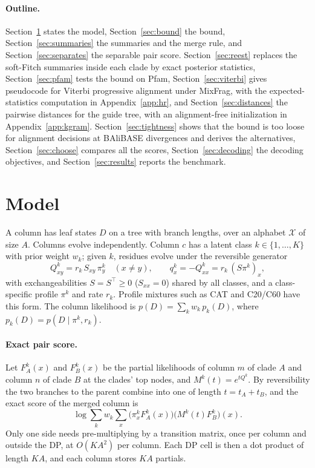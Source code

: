 \documentclass[11pt]{article}
\newcommand{\Xset}{\mathcal X}
\begin{document}
\paragraph{Outline.} Section~\ref{sec:model} states the model,
Section~\ref{sec:bound} the bound, Section~\ref{sec:summaries} the summaries
and the merge rule, and Section~\ref{sec:separates} the separable pair score.
Section~\ref{sec:reest} replaces the soft-Fitch summaries inside each clade by
exact posterior statistics, Section~\ref{sec:pfam} tests the bound on Pfam,
Section~\ref{sec:viterbi} gives pseudocode for Viterbi progressive
alignment under MixFrag, with the expected-statistics computation in
Appendix~\ref{app:hr}, and Section~\ref{sec:distances} the pairwise distances
for the guide tree, with an alignment-free initialization in
Appendix~\ref{app:kgram}. Section~\ref{sec:tightness} shows that the bound is too
loose for alignment decisions at BAliBASE divergences and derives the
alternatives, Section~\ref{sec:choose} compares all the scores,
Section~\ref{sec:decoding} the decoding objectives, and
Section~\ref{sec:results} reports the benchmark.

\section{Model}
\label{sec:model}

A column has leaf states $D$ on a tree with branch lengths, over an alphabet
$\Xset$ of size $A$. Columns evolve independently. Column $c$ has a latent
class $k\in\{1,\dots,K\}$ with prior weight $w_k$; given $k$, residues evolve
under the reversible generator
\[
Q^k_{xy}=r_k\,S_{xy}\,\pi^k_y\quad(x\ne y),\qquad
q^k_x=-Q^k_{xx}=r_k\,(S\pi^k)_x ,
\]
with exchangeabilities $S=S^\top\ge0$ ($S_{xx}=0$) shared by all classes, and a
class-specific profile $\pi^k$ and rate $r_k$. Profile mixtures such as CAT
\citep{Lartillot2004} and C20/C60 \citep{LeGascuelLartillot2008} have this form. The column
likelihood is $p(D)=\sum_kw_k\,p_k(D)$, where $p_k(D)=p(D\mid\pi^k,r_k)$.

\paragraph{Exact pair score.} Let $F^k_A(x)$ and $F^k_B(x)$ be the partial
likelihoods of column $m$ of clade $A$ and column $n$ of clade $B$ at the
clades' top nodes, and $M^k(t)=e^{tQ^k}$. By reversibility the two branches
to the parent combine into one of length $t=t_A+t_B$, and the exact score of
the merged column is
\[
\log\sum_kw_k\sum_x\big(\pi^k_xF^k_A(x)\big)\big(M^k(t)F^k_B\big)(x).
\]
Only one side needs pre-multiplying by a transition matrix, once per column
and outside the DP, at $O(KA^2)$ per column. Each DP cell is then a dot
product of length $KA$, and each column stores $KA$ partials.
\end{document}
